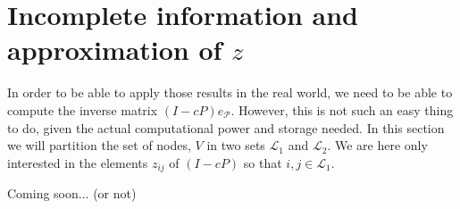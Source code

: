 \documentclass{article}
\newcommand{\1}{\mathbf{1}}
\theoremstyle{definition}
\begin{document}
\section{Incomplete information and approximation of $z$}
In order to be able to apply those results in the real world, we need to be able to compute the inverse matrix \((I-cP)e_{\mathcal{P}}\). However, this is not such an easy thing to do, given the actual computational power and storage needed. In this section we will partition the set of nodes, \(V\) in two sets \(\mathcal{L}_1\) and \(\mathcal{L}_2\). We are here only interested in the elements \(z_{ij}\) of \((I-cP)\) so that \(i,j \in \mathcal{L}_1\).

Coming soon... (or not)



\end{document}
